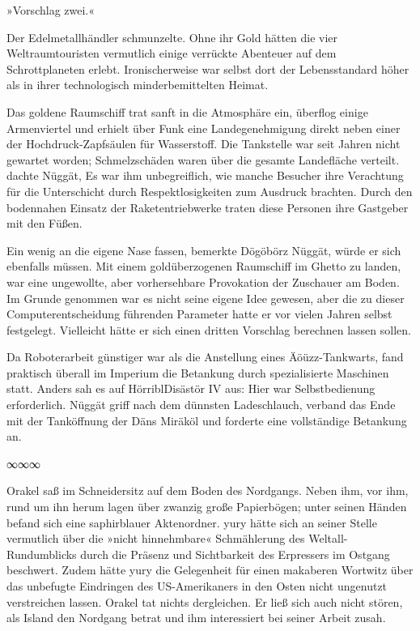 »Vorschlag zwei.«


Der Edelmetallhändler schmunzelte. Ohne ihr Gold hätten die vier Weltraumtouristen vermutlich einige verrückte Abenteuer auf dem Schrottplaneten erlebt. Ironischerweise war selbst dort der Lebensstandard höher als in ihrer technologisch minderbemittelten Heimat.

Das goldene Raumschiff trat sanft in die Atmosphäre ein, überflog einige Armenviertel und erhielt über Funk eine Landegenehmigung direkt neben einer der Hochdruck-Zapfsäulen für Wasserstoff. Die Tankstelle war seit Jahren nicht gewartet worden; Schmelzschäden waren über die gesamte Landefläche verteilt.  dachte Nüggät,  Es war ihm unbegreiflich, wie manche Besucher ihre Verachtung für die Unterschicht durch Respektlosigkeiten zum Ausdruck brachten. Durch den bodennahen Einsatz der Raketentriebwerke traten diese Personen ihre Gastgeber mit den Füßen.

Ein wenig an die eigene Nase fassen, bemerkte Dögöbörz Nüggät, würde er sich ebenfalls müssen. Mit einem goldüberzogenen Raumschiff im Ghetto zu landen, war eine ungewollte, aber vorhersehbare Provokation der Zuschauer am Boden. Im Grunde genommen war es nicht seine eigene Idee gewesen, aber die zu dieser Computerentscheidung führenden Parameter hatte er vor vielen Jahren selbst festgelegt. Vielleicht hätte er sich einen dritten Vorschlag berechnen lassen sollen.

Da Roboterarbeit günstiger war als die Anstellung eines Äöüzz-Tankwarts, fand praktisch überall im Imperium die Betankung durch spezialisierte Maschinen statt. Anders sah es auf HörriblDisästör IV aus: Hier war Selbstbedienung erforderlich. Nüggät griff nach dem dünnsten Ladeschlauch, verband das Ende mit der Tanköffnung der Däns Miräköl und forderte eine vollständige Betankung an.

\begin{center}
∞∞∞
\end{center}

Orakel saß im Schneidersitz auf dem Boden des Nordgangs. Neben ihm, vor ihm, rund um ihn herum lagen über zwanzig große Papierbögen; unter seinen Händen befand sich eine saphirblauer Aktenordner. yury hätte sich an seiner Stelle vermutlich über die »nicht hinnehmbare« Schmählerung des Weltall-Rundumblicks durch die Präsenz und Sichtbarkeit des Erpressers im Ostgang beschwert. Zudem hätte yury die Gelegenheit für einen makaberen Wortwitz über das unbefugte Eindringen des US-Amerikaners in den Osten nicht ungenutzt verstreichen lassen. Orakel tat nichts dergleichen. Er ließ sich auch nicht stören, als Island den Nordgang betrat und ihm interessiert bei seiner Arbeit zusah.

